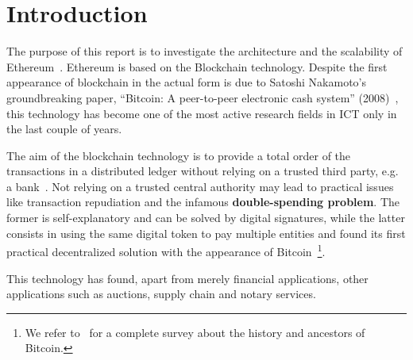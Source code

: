\section{Introduction}

The purpose of this report is to investigate the architecture and the
scalability of Ethereum~\cite{wood2018ethereum}. Ethereum is based on the
Blockchain technology. Despite the first appearance of blockchain in the actual
form is due to Satoshi Nakamoto's groundbreaking paper, ``Bitcoin: A
peer-to-peer electronic cash system'' (2008)~\cite{bib:bitcoin}, this
technology has become one of the most active research fields in ICT only in the
last couple of years.


The aim of the blockchain technology is to provide a total order of the
transactions in a distributed ledger without relying on a trusted third party,
e.g. a bank~\cite{bib:the-quest}. Not relying on a trusted central authority may
lead to practical issues like transaction repudiation and the infamous
\textbf{double-spending problem}. The former is self-explanatory and can be
solved by digital signatures, while the latter consists in using the same
digital token to pay multiple entities and found its first practical
decentralized solution with the appearance of
Bitcoin~\cite{ethereumwp}\footnote{We refer to~\cite{ethereumwp} for a complete
survey about the history and ancestors of Bitcoin.}.

This technology has found, apart from merely financial applications, other
applications such as auctions, supply chain and notary services.

